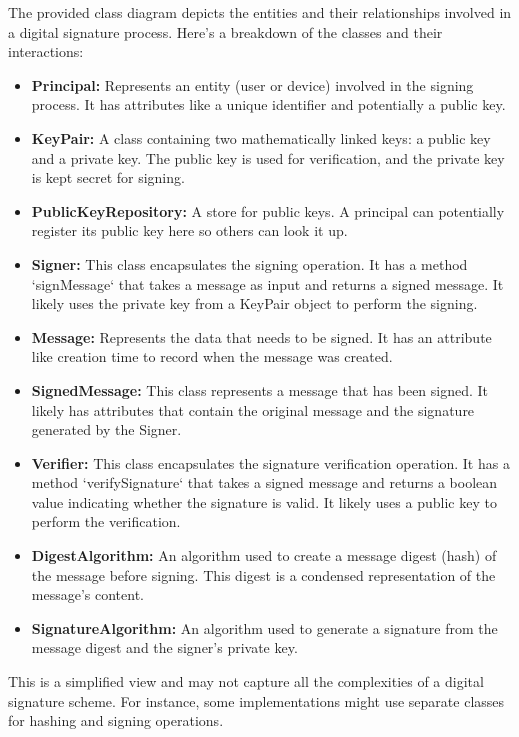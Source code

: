 \documentclass[10pt]{report}
\begin{document}
The provided class diagram depicts the entities and their relationships involved in a digital signature process. Here's a breakdown of the classes and their interactions:

\begin{itemize}
\item \textbf{Principal:} Represents an entity (user or device) involved in the signing process. It has attributes like a unique identifier and potentially a public key.
\item \textbf{KeyPair:}  A class containing two mathematically linked keys: a public key and a private key. The public key is used for verification, and the private key is kept secret for signing.
\item \textbf{PublicKeyRepository:}  A store for public keys. A principal can potentially register its public key here so others can look it up.

\item \textbf{Signer:}  This class encapsulates the signing operation. It has a method `signMessage` that takes a message as input and returns a signed message. It likely uses the private key from a KeyPair object to perform the signing.
\item \textbf{Message:}  Represents the data that needs to be signed. It has an attribute like creation time to record when the message was created.
\item \textbf{SignedMessage:}   This class represents a message that has been signed. It likely has attributes that contain the original message and the signature generated by the Signer.
\item \textbf{Verifier:}   This class encapsulates the signature verification operation. It has a method `verifySignature` that takes a signed message and returns a boolean value indicating whether the signature is valid. It likely uses a public key to perform the verification.
\item \textbf{DigestAlgorithm:}   An algorithm used to create a message digest (hash) of the message before signing. This digest is a condensed representation of the message’s content.
\item \textbf{SignatureAlgorithm:}  An algorithm used to generate a signature from the message digest and the signer’s private key.
\end{itemize}

This is a simplified view and may not capture all the complexities of a digital signature scheme. For instance, some implementations might use separate classes for hashing and signing operations.
\end{document}
